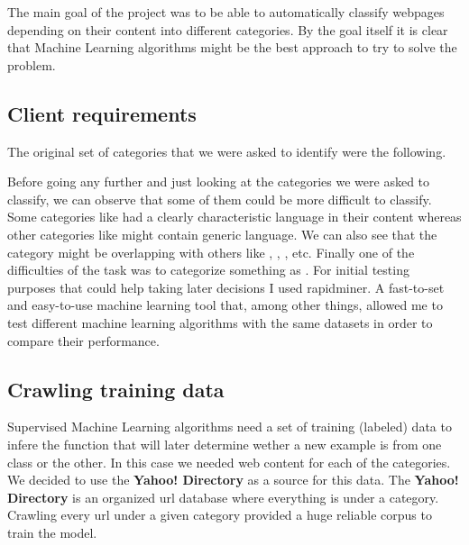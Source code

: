 
The main goal of the project was to be able to automatically classify webpages depending on their content into different categories. 
By the goal itself it is clear that Machine Learning algorithms might be the best approach to try to solve the problem. 

\subsection{Client requirements}

The original set of categories that we were asked to identify were the following.


Before going any further and just looking at the categories we were asked to classify, we can observe that some of them could be more difficult to classify.
Some categories like  had a clearly characteristic language in their content whereas other categories like  might contain generic language.
We can also see that the category  might be overlapping with others like , , , etc. 
Finally one of the difficulties of the task was to categorize something as . 
For initial testing purposes that could help taking later decisions I used rapidminer. A fast-to-set and easy-to-use machine learning tool that, among other things, allowed me to test different
machine learning algorithms with the same datasets in order to compare their performance.

\subsection{Crawling training data}
Supervised Machine Learning algorithms need a set of training (labeled) data to infere the function that will later determine wether a new example is from one class or the other. In this case we needed
web content for each of the categories. We decided to use the {\bf Yahoo! Directory}\cite{yahoo} as a source for this data.
The {\bf Yahoo! Directory} is an organized url database where everything is under a category. Crawling every url under a given category provided a huge reliable corpus to train the model.

  


